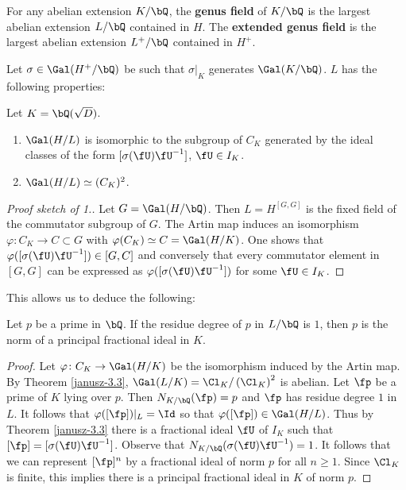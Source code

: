 \begin{defn}
    For any abelian extension $K / \bQ$, the \textbf{genus field} of $K / \bQ$ is the largest abelian extension $L / \bQ$ contained in $H$. The \textbf{extended genus field } is the largest abelian extension $L^{+} / \bQ $ contained in $H^{+}$.
\end{defn}

Let $\sigma \in \Gal(H^{+} / \bQ)$ be such that $\sigma|_{K}$ generates $\Gal(K / \bQ)$. $L$ has the following properties:

\begin{thm}\cite[Ch. VI, $\S$3, Theorem 3.3]{Janusz}\label{janusz-3.3}
    Let $K = \bQ(\sqrt{D})$.
    \begin{enumerate}
        \item $\Gal(H / L)$ is isomorphic to the subgroup of $C_K$ generated by the ideal classes of the form $[\sigma(\fU)\fU^{-1}]$, $\fU \in I_K$. 
        \item $\Gal(H / L) \simeq (C_K)^2$. 
    \end{enumerate}
\end{thm}

\begin{proof}[Proof sketch of 1.]
    Let $G = \Gal(H / \bQ)$. Then $L = H^{[G, G]}$ is the fixed field of the commutator subgroup of $G$. The Artin map induces an isomorphism $\varphi \colon C_K \to C \subset G$ with $\varphi(C_K) \simeq C = \Gal(H / K)$. One shows that $\varphi([\sigma(\fU)\fU^{-1}]) \in [G, C]$ and conversely that every commutator element in $[G, G]$ can be expressed as $\varphi([\sigma(\fU)\fU^{-1}])$ for some $\fU \in I_K$. 
\end{proof}

This allows us to deduce the following:

\begin{thm}\label{p-principal}
Let $p$ be a prime in $\bQ$. If the residue degree of $p$ in $L / \bQ$ is $1$, then $p$ is the norm of a principal fractional ideal in $K$. 
\end{thm} 

\begin{proof}
Let $\varphi \colon C_K \to \Gal(H / K)$ be the isomorphism induced by the Artin map. By Theorem \ref{janusz-3.3}, $\Gal(L / K) = \Cl_K / \left(\Cl_K\right)^2$ is abelian. Let $\fp$ be a prime of $K$ lying over $p$. Then $N_{K / \bQ}(\fp) = p$ and $\fp$ has residue degree $1$ in $L$. It follows that $\varphi([\fp])|_{L} = \Id$ so that $\varphi([\fp]) \in \Gal(H / L)$. Thus by Theorem \ref{janusz-3.3} there is a fractional ideal $\fU$ of $I_K$ such that 
$[\fp] = [\sigma(\fU)\fU^{-1}]$. Observe that $N_{K / \bQ}(\sigma(\fU)\fU^{-1}) = 1$. It follows that we can represent $[\fp]^n$ by a fractional ideal of norm $p$ for all $n \geq 1$. Since $\Cl_K$ is finite, this implies there is a principal fractional ideal in $K$ of norm $p$. 
\end{proof}

